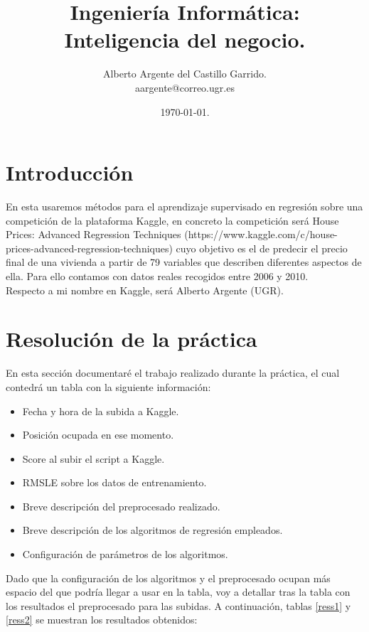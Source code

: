 \documentclass[14pt]{extarticle}
\title{Ingeniería Informática: \\
	\textbf{Inteligencia del negocio.}}
\author{Alberto Argente del Castillo Garrido. \\
	aargente@correo.ugr.es}
\date{\today.}
\begin{document}
\maketitle
\tableofcontents

\newpage
\section{Introducción}
En esta usaremos métodos para el aprendizaje supervisado en regresión sobre una competición de la plataforma Kaggle, en concreto la competición será House Prices: Advanced Regression Techniques (https://www.kaggle.com/c/house-prices-advanced-regression-techniques) cuyo objetivo es el de predecir el precio final de una vivienda a partir de 79 variables que describen diferentes aspectos de ella. Para ello contamos con datos reales recogidos entre 2006 y 2010. \\

Respecto a mi nombre en Kaggle, será Alberto Argente (UGR).

\section{Resolución de la práctica}
En esta sección documentaré el trabajo realizado durante la práctica, el cual contedrá un tabla con la siguiente información:
\begin{itemize}
	\item Fecha y hora de la subida a Kaggle.
	\item Posición ocupada en ese momento.
	\item Score al subir el script a Kaggle.
	\item RMSLE sobre los datos de entrenamiento.
	\item Breve descripción del preprocesado realizado.
	\item Breve descripción de los algoritmos de regresión empleados.
	\item Configuración de parámetros de los algoritmos.
\end{itemize}

Dado que la configuración de los algoritmos y el preprocesado ocupan más espacio del que podría llegar a usar en la tabla, voy a detallar tras la tabla con los resultados el preprocesado para las subidas. A continuación, tablas \ref{ress1} y \ref{ress2} se muestran los resultados obtenidos: \\
\end{document}
